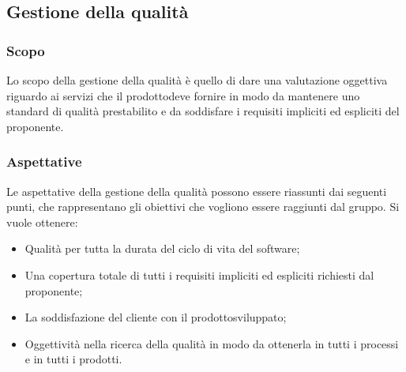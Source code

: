 \subsection{Gestione della qualità}
\subsubsection{Scopo}
Lo scopo della gestione della qualità è quello di dare una valutazione oggettiva riguardo ai servizi che il prodotto\glosp deve fornire in modo da mantenere uno standard di qualità prestabilito e da soddisfare i requisiti impliciti ed espliciti del proponente.
\subsubsection{Aspettative}
Le aspettative della gestione della qualità possono essere riassunti dai seguenti punti, che rappresentano gli obiettivi che vogliono essere raggiunti dal gruppo. Si vuole ottenere:
\begin{itemize}
	\item Qualità per tutta la durata del ciclo di vita del software;
	\item Una copertura totale di tutti i requisiti impliciti ed espliciti richiesti dal proponente;
	\item La soddisfazione del cliente con il prodotto\glosp sviluppato;
	\item Oggettività nella ricerca della qualità in modo da ottenerla in tutti i processi e in tutti i prodotti\glo.
\end{itemize}
